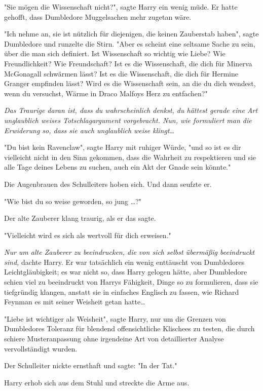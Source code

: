 {"Sie mögen die Wissenschaft nicht?", sagte Harry ein wenig müde. Er hatte gehofft, dass Dumbledore Muggelsachen mehr zugetan wäre.

"Ich nehme an, sie ist nützlich für diejenigen, die keinen Zauberstab haben", sagte Dumbledore und runzelte die Stirn. "Aber es scheint eine seltsame Sache zu sein, über die man sich definiert. Ist Wissenschaft so wichtig wie Liebe? Wie Freundlichkeit? Wie Freundschaft? Ist es die Wissenschaft, die dich für Minerva McGonagall schwärmen lässt? Ist es die Wissenschaft, die dich für Hermine Granger empfinden lässt? Wird es die Wissenschaft sein, an die du dich wendest, wenn du versuchst, Wärme in Draco Malfoys Herz zu entfachen?"

\emph{Das Traurige daran ist, dass du wahrscheinlich denkst, du hättest gerade eine Art unglaublich weises Totschlagargument vorgebracht. Nun, wie formuliert man die Erwiderung so, dass sie auch unglaublich weise klingt…}

"Du bist kein Ravenclaw", sagte Harry mit ruhiger Würde, "und so ist es dir vielleicht nicht in den Sinn gekommen, dass die Wahrheit zu respektieren und sie alle Tage deines Lebens zu suchen, auch ein Akt der Gnade sein könnte."

Die Augenbrauen des Schulleiters hoben sich. Und dann seufzte er.

"Wie bist du so weise geworden, so jung …?"

Der alte Zauberer klang traurig, als er das sagte.

"Vielleicht wird es sich als wertvoll für dich erweisen."

\emph{Nur um alte Zauberer zu beeindrucken, die von sich selbst übermäßig beeindruckt sind,} dachte Harry. Er war tatsächlich ein wenig enttäuscht von Dumbledores Leichtgläubigkeit; es war nicht so, dass Harry gelogen hätte, aber Dumbledore schien viel zu beeindruckt von Harrys Fähigkeit, Dinge so zu formulieren, dass sie tiefgründig klangen, anstatt sie in einfaches Englisch zu fassen, wie Richard Feynman es mit seiner Weisheit getan hatte…

"Liebe ist wichtiger als Weisheit", sagte Harry, nur um die Grenzen von Dumbledores Toleranz für blendend offensichtliche Klischees zu testen, die durch schiere Musteranpassung ohne irgendeine Art von detaillierter Analyse vervollständigt wurden.

Der Schulleiter nickte ernsthaft und sagte: "In der Tat."

Harry erhob sich aus dem Stuhl und streckte die Arme aus.

}
